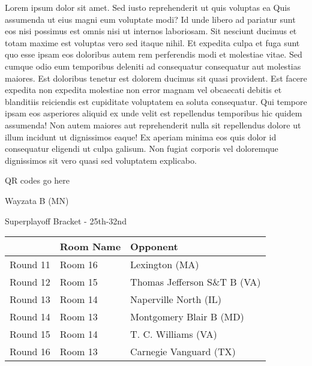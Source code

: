 \documentclass{article}%
\begin{document}
\vspace*{8pt}%
\linebreak%
\newline%
\newline%
    Lorem ipsum dolor sit amet. Sed iusto reprehenderit ut quis voluptas ea Quis assumenda ut eius magni eum voluptate modi? Id unde libero ad pariatur sunt eos nisi possimus est omnis nisi ut internos laboriosam. Sit nesciunt ducimus et totam maxime est voluptas vero sed itaque nihil. Et expedita culpa et fuga sunt quo esse ipsam eos doloribus autem rem perferendis modi et molestiae vitae.\newline%
\newline%
    Sed cumque odio eum temporibus deleniti ad consequatur consequatur aut molestias maiores. Est doloribus tenetur est dolorem ducimus sit quasi provident. Est facere expedita non expedita molestiae non error magnam vel obcaecati debitis et blanditiis reiciendis est cupiditate voluptatem ea soluta consequatur. Qui tempore ipsam eos asperiores aliquid ex unde velit est repellendus temporibus hic quidem assumenda!\newline%
\newline%
    Non autem maiores aut reprehenderit nulla sit repellendus dolore ut illum incidunt ut dignissimos eaque! Ex aperiam minima eos quis dolor id consequatur eligendi ut culpa galisum. Non fugiat corporis vel doloremque dignissimos sit vero quasi sed voluptatem explicabo.\newline%
\newline%
\vspace*{30pt}%
\begin{center}%
\begin{Huge}%
QR codes go here%
\end{Huge}%
\end{center}%
\newpage%
\begin{center}%
\begin{Huge}%
Wayzata B (MN)%
\end{Huge}%
\vspace*{8pt}%
\linebreak%
\begin{Large}%
Superplayoff Bracket {-} 25th{-}32nd%
\end{Large}%
\end{center}%
%
\begin{tabularx}{\textwidth}{|c|Y|Y|}%
\hline%
&Room Name&Opponent\\%
\hline%
Round 11&Room 16&Lexington (MA)\\%
Round 12&Room 15&Thomas Jefferson S\&T B (VA)\\%
Round 13&Room 14&Naperville North (IL)\\%
Round 14&Room 13&Montgomery Blair B (MD)\\%
Round 15&Room 14&T. C. Williams (VA)\\%
Round 16&Room 13&Carnegie Vanguard (TX)\\%
\hline%
\end{tabularx}%
\end{document}
